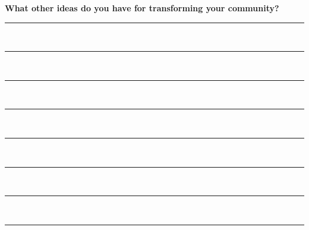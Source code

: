 \noindent\textcolor{ProcessBlue}{\textbf{\LARGE{What other ideas do you have for transforming your community?}}}\\

\noindent\rule{\textwidth}{1pt}\\
\noindent\rule{\textwidth}{1pt}\\
\noindent\rule{\textwidth}{1pt}\\
\noindent\rule{\textwidth}{1pt}\\
\noindent\rule{\textwidth}{1pt}\\
\noindent\rule{\textwidth}{1pt}\\
\noindent\rule{\textwidth}{1pt}\\
\noindent\rule{\textwidth}{1pt}\\\\
